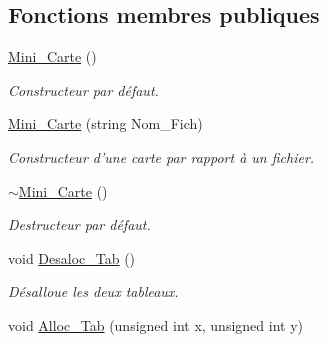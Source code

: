 \subsection*{Fonctions membres publiques}
\begin{DoxyCompactItemize}
\item 
\hypertarget{classMini__Carte_aaf8ff27aeacc064c4d5d624316f6ff1f}{\hyperlink{classMini__Carte_aaf8ff27aeacc064c4d5d624316f6ff1f}{Mini\+\_\+\+Carte} ()}\label{classMini__Carte_aaf8ff27aeacc064c4d5d624316f6ff1f}

\begin{DoxyCompactList}\small\item\em Constructeur par défaut. \end{DoxyCompactList}\item 
\hypertarget{classMini__Carte_a8b4f208bc954b0e5591a429e3fab4ff6}{\hyperlink{classMini__Carte_a8b4f208bc954b0e5591a429e3fab4ff6}{Mini\+\_\+\+Carte} (string Nom\+\_\+\+Fich)}\label{classMini__Carte_a8b4f208bc954b0e5591a429e3fab4ff6}

\begin{DoxyCompactList}\small\item\em Constructeur d'une carte par rapport à un fichier. \end{DoxyCompactList}\item 
\hypertarget{classMini__Carte_a0a1df1661df087726886947c67cdc102}{\hyperlink{classMini__Carte_a0a1df1661df087726886947c67cdc102}{$\sim$\+Mini\+\_\+\+Carte} ()}\label{classMini__Carte_a0a1df1661df087726886947c67cdc102}

\begin{DoxyCompactList}\small\item\em Destructeur par défaut. \end{DoxyCompactList}\item 
\hypertarget{classMini__Carte_a30139202067e4c75e278598925654613}{void \hyperlink{classMini__Carte_a30139202067e4c75e278598925654613}{Desaloc\+\_\+\+Tab} ()}\label{classMini__Carte_a30139202067e4c75e278598925654613}

\begin{DoxyCompactList}\small\item\em Désalloue les deux tableaux. \end{DoxyCompactList}\item 
\hypertarget{classMini__Carte_a71a52a8ec4d894d394e79e8e24543822}{void \hyperlink{classMini__Carte_a71a52a8ec4d894d394e79e8e24543822}{Alloc\+\_\+\+Tab} (unsigned int x, unsigned int y)}\label{classMini__Carte_a71a52a8ec4d894d394e79e8e24543822}


\end{DoxyCompactItemize}
